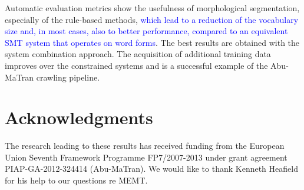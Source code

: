 \documentclass[postprint]{flammie}
\begin{document}
Automatic evaluation metrics show the usefulness of morphological segmentation, especially of the rule-based methods, \textcolor{blue}{which lead to a reduction of the vocabulary size and, in most cases, also to better performance, compared to an equivalent SMT system that operates on word forms}.
The best results are obtained with the system combination approach. %
The acquisition of additional training data improves over the constrained systems and is a successful example of the Abu-MaTran crawling pipeline.
%

%
\section*{Acknowledgments}
The research leading to these results has received funding from the European Union Seventh Framework Programme FP7/2007-2013 under grant agreement PIAP-GA-2012-324414 (Abu-MaTran).
We would like to thank Kenneth Heafield for his help to our questions re MEMT.
%


%
\end{document}
